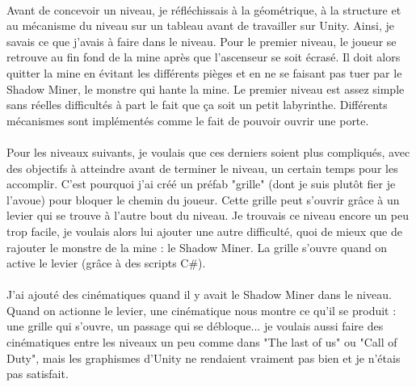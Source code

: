 \documentclass[titlepage, 13px, a4paper]{report}
\begin{document}
\paragraph*{} \hspace{0pt}
Avant de concevoir un niveau, je réfléchissais à la géométrique, à la structure et au 
mécanisme du niveau sur un tableau avant de travailler sur Unity. Ainsi, je savais ce 
que j'avais à faire dans le niveau. Pour le premier niveau, le joueur se retrouve au fin 
fond de la mine après que l'ascenseur se soit écrasé. Il doit alors quitter la mine en 
évitant les différents pièges et en ne se faisant pas tuer par le Shadow Miner, le monstre 
qui hante la mine. Le premier niveau est assez simple sans réelles difficultés à part le fait 
que ça soit un petit labyrinthe. Différents mécanismes sont implémentés comme le fait de 
pouvoir ouvrir une porte. \\

\newpage

\paragraph*{} \hspace{0pt}
Pour les niveaux suivants, je voulais que ces derniers soient plus compliqués, avec des 
objectifs à atteindre avant de terminer le niveau, un certain temps pour les accomplir. 
C'est pourquoi j'ai créé un préfab "grille" (dont je suis plutôt fier je l'avoue) pour bloquer 
le chemin du joueur. Cette grille peut s'ouvrir grâce à un levier qui se trouve à l'autre bout 
du niveau. Je trouvais ce niveau encore un peu trop facile, je voulais alors lui ajouter une autre 
difficulté, quoi de mieux que de rajouter le monstre de la mine : le Shadow Miner. La grille 
s'ouvre quand on active le levier (grâce à des scripts C\#).  \\

\paragraph*{} \hspace{0pt}
J'ai ajouté des cinématiques quand il y avait le Shadow Miner dans le niveau. 
Quand on actionne le levier, une cinématique nous montre ce qu'il se produit : une 
grille qui s'ouvre, un passage qui se débloque... je voulais aussi faire des cinématiques 
entre les niveaux un peu comme dans "The last of us" ou "Call of Duty", mais les graphismes 
d'Unity ne rendaient vraiment pas bien et je n'étais pas satisfait. \\
\end{document}
